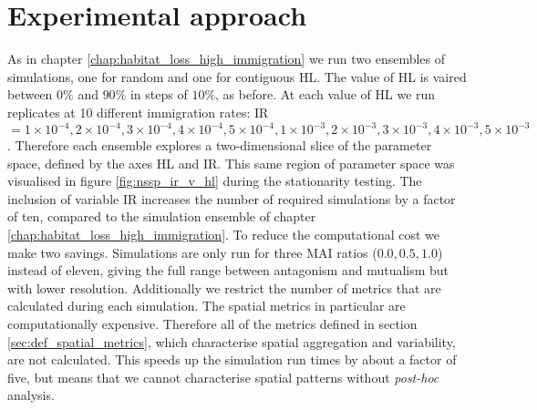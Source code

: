 
%


\section{Experimental approach}
\label{sec:exp_method}

As in chapter \ref{chap:habitat_loss_high_immigration} we run two ensembles of simulations, one for random and one for contiguous HL. The value of HL  is vaired between $0\%$ and $90\%$ in steps of $10\%$, as before. At each value of HL we run replicates at 10 different immigration rates: IR$ = 1 \times 10^{-4},2 \times 10^{-4},3 \times 10^{-4},4 \times 10^{-4},5 \times 10^{-4},1 \times 10^{-3},2 \times 10^{-3},3 \times 10^{-3},4 \times 10^{-3},5 \times 10^{-3}$. Therefore each ensemble explores a two-dimensional slice of the parameter space, defined by the axes HL and IR. This same region of parameter space was visualised in figure \ref{fig:nssp_ir_v_hl} during the stationarity testing. The inclusion of variable IR increases the number of required simulations by a factor of ten, compared to the simulation ensemble of chapter \ref{chap:habitat_loss_high_immigration}. To reduce the computational cost we make two savings. Simulations are only run for three MAI ratios ($0.0,0.5,1.0$) instead of eleven, giving the full range between antagonism and mutualism but with lower resolution. Additionally we restrict the number of metrics that are calculated during each simulation. The spatial metrics in particular are computationally expensive. Therefore all of the metrics defined in section \ref{sec:def_spatial_metrics}, which characterise spatial aggregation and variability, are not calculated. This speeds up the simulation run times by about a factor of five, but means that we cannot characterise spatial patterns without \emph{post-hoc} analysis.

